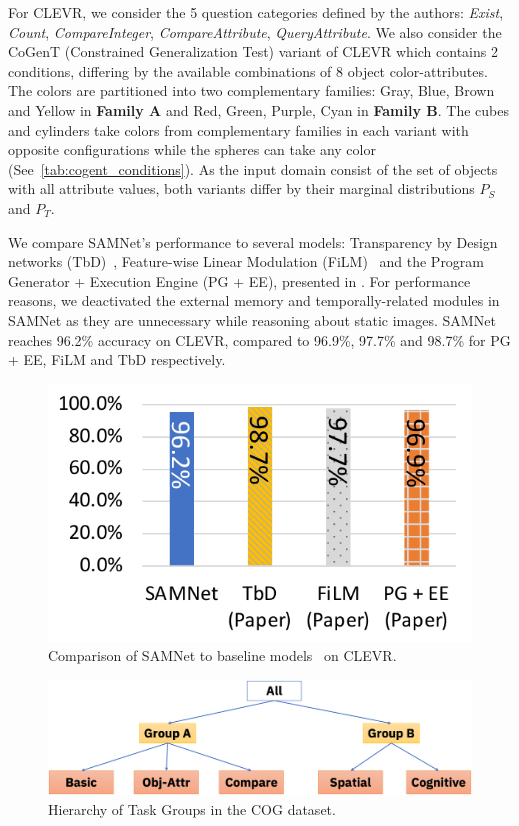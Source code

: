 For CLEVR, we consider the 5 question categories defined by the authors: \textit{Exist}, \textit{Count}, \textit{CompareInteger}, \textit{CompareAttribute}, \textit{QueryAttribute}. We also consider the CoGenT (Constrained Generalization Test) variant of CLEVR which contains 2 conditions, differing by the available combinations of 8 object color-attributes. The colors are partitioned into two complementary families:
Gray, Blue, Brown and Yellow in \textbf{Family A} and Red, Green, Purple, Cyan in \textbf{Family B}.
The cubes and cylinders take colors from complementary families in each variant with opposite configurations while the spheres can take any color (See~\cref{tab:cogent_conditions}).
As the input domain consist of the set of objects with all attribute values, both variants differ by their marginal distributions $P_S$ and $P_T$.

We compare SAMNet's performance to several models: Transparency by Design networks (TbD)~\cite{mascharka2018transparency}, Feature-wise Linear Modulation (FiLM)~\cite{perez2018film} and the Program Generator + Execution Engine (PG + EE), presented in \cite{johnson2017inferring}. For performance reasons, we deactivated the external memory and temporally-related modules in SAMNet as they are unnecessary while reasoning about static images. SAMNet reaches 96.2\% accuracy on CLEVR, compared to 96.9\%, 97.7\% and 98.7\% for PG + EE, FiLM and TbD respectively.

\begin{figure}[!t]
	\centering
	\includegraphics[width=0.8\columnwidth]{../results/CLEVR_baselines_comparison.pdf}
	\caption{Comparison of SAMNet to baseline models~\cite{mascharka2018transparency, perez2018film, johnson2017inferring} on CLEVR.}
	\label{fig:clevr-baseline-compare}
\end{figure}

\begin{figure}[htb]
	\centering
	\includegraphics[width=\columnwidth]{../img/architecture/hierarchy}
	\caption{Hierarchy of Task Groups in the COG dataset.}
	\label{fig:task-groups}
\end{figure}


